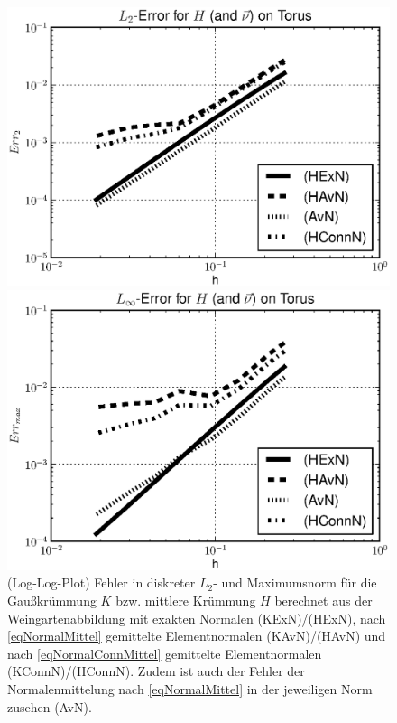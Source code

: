 \begin{beispiel}[Torus]
\begin{figure}
\begin{minipage}[t]{0.49\textwidth}
        \end{minipage}\\
        \begin{minipage}[t]{0.49\textwidth}
          \centering\includegraphics[width=\textwidth]{bilder/Curvature/TorusHWein2Plot.eps}
        \end{minipage}\hfill
        \begin{minipage}[t]{0.49\textwidth}
          \centering\includegraphics[width=\textwidth]{bilder/Curvature/TorusHWeinMaxPlot.eps}
        \end{minipage}
        \caption[Fehler Gauß-/mittlere Krümmung aus Weingartenabb. auf Torus]
                {(Log-Log-Plot) Fehler in diskreter \( L_{2} \)- und Maximumsnorm für die Gaußkrümmung \( K \) bzw. mittlere Krümmung \( H \) berechnet aus
                der Weingartenabbildung mit exakten Normalen (KExN)/(HExN), 
                nach \eqref{eqNormalMittel} gemittelte Elementnormalen (KAvN)/(HAvN) 
                und nach \eqref{eqNormalConnMittel} gemittelte Elementnormalen (KConnN)/(HConnN).
                Zudem ist auch der Fehler der Normalenmittelung nach \eqref{eqNormalMittel} in der jeweiligen Norm zusehen (AvN).}
        \label{figWeingartenFehlerTorus}
      \end{figure}
    \end{beispiel}


